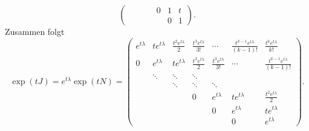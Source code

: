 \begin{anwendung}
\[\begin{pmatrix}
	&        &               &                & 0              & 1                      & t                      \\
	&        &               &                &                & 0                      & 1
	\end{pmatrix}.
	\]
	Zusammen folgt
	\[
	\exp(tJ) = e^{t\lambda} \exp(tN) =
	\begin{pmatrix}
	e^{t\lambda} & te^{t\lambda} & \frac{t^2e^{t\lambda}}{2} & \frac{t^3e^{t\lambda}}{3!} & \cdots                     & \frac{t^{k-1}e^{t\lambda}}{(k-1)!} & \frac{t^{k}e^{t\lambda}}{k!}       \\
	0            & e^{t\lambda}  & te^{t\lambda}             & \frac{t^2e^{t\lambda}}{2}  & \frac{t^3e^{t\lambda}}{3!} & \cdots                             & \frac{t^{k-1}e^{t\lambda}}{(k-1)!} \\
	& \ddots        & \ddots                    & \ddots                     &                            &                                    &  \\
	&               & \ddots                    & \ddots                     & \ddots                     &                                    &  \\
	&               &                           & 0                          & e^{t\lambda}               & te^{t\lambda}                      & \frac{t^2e^{t\lambda}}{2}          \\
	&               &                           &                            & 0                          & e^{t\lambda}                       & te^{t\lambda}                      \\
	&               &                           &                            &                            & 0                                  & e^{t\lambda}
	\end{pmatrix}.
	\]
\end{anwendung}
\newpage

